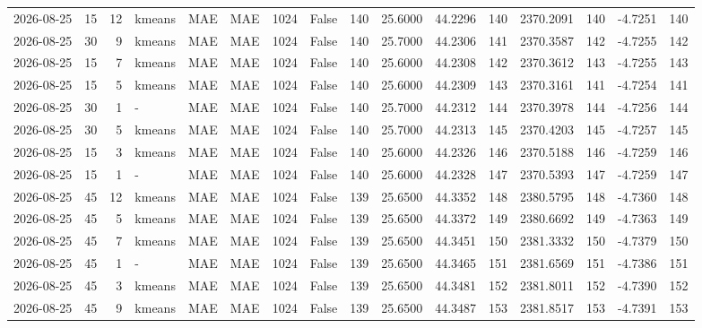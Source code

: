 \documentclass[10pt]{article}
\begin{document}
\begin{landscape}
\begin{longtable}{@{}lrrlllrcrrrrrrrr@{}}
2026-08-25 & 15 & 12 & kmeans & MAE & MAE & 1024 & False & 140 & 25.6000 & 44.2296 & 140 & 2370.2091 & 140 & -4.7251 & 140 \\
2026-08-25 & 30 & 9 & kmeans & MAE & MAE & 1024 & False & 140 & 25.7000 & 44.2306 & 141 & 2370.3587 & 142 & -4.7255 & 142 \\
2026-08-25 & 15 & 7 & kmeans & MAE & MAE & 1024 & False & 140 & 25.6000 & 44.2308 & 142 & 2370.3612 & 143 & -4.7255 & 143 \\
2026-08-25 & 15 & 5 & kmeans & MAE & MAE & 1024 & False & 140 & 25.6000 & 44.2309 & 143 & 2370.3161 & 141 & -4.7254 & 141 \\
2026-08-25 & 30 & 1 & - & MAE & MAE & 1024 & False & 140 & 25.7000 & 44.2312 & 144 & 2370.3978 & 144 & -4.7256 & 144 \\
2026-08-25 & 30 & 5 & kmeans & MAE & MAE & 1024 & False & 140 & 25.7000 & 44.2313 & 145 & 2370.4203 & 145 & -4.7257 & 145 \\
2026-08-25 & 15 & 3 & kmeans & MAE & MAE & 1024 & False & 140 & 25.6000 & 44.2326 & 146 & 2370.5188 & 146 & -4.7259 & 146 \\
2026-08-25 & 15 & 1 & - & MAE & MAE & 1024 & False & 140 & 25.6000 & 44.2328 & 147 & 2370.5393 & 147 & -4.7259 & 147 \\
2026-08-25 & 45 & 12 & kmeans & MAE & MAE & 1024 & False & 139 & 25.6500 & 44.3352 & 148 & 2380.5795 & 148 & -4.7360 & 148 \\
2026-08-25 & 45 & 5 & kmeans & MAE & MAE & 1024 & False & 139 & 25.6500 & 44.3372 & 149 & 2380.6692 & 149 & -4.7363 & 149 \\
2026-08-25 & 45 & 7 & kmeans & MAE & MAE & 1024 & False & 139 & 25.6500 & 44.3451 & 150 & 2381.3332 & 150 & -4.7379 & 150 \\
2026-08-25 & 45 & 1 & - & MAE & MAE & 1024 & False & 139 & 25.6500 & 44.3465 & 151 & 2381.6569 & 151 & -4.7386 & 151 \\
2026-08-25 & 45 & 3 & kmeans & MAE & MAE & 1024 & False & 139 & 25.6500 & 44.3481 & 152 & 2381.8011 & 152 & -4.7390 & 152 \\
2026-08-25 & 45 & 9 & kmeans & MAE & MAE & 1024 & False & 139 & 25.6500 & 44.3487 & 153 & 2381.8517 & 153 & -4.7391 & 153 \\
\bottomrule
\end{longtable}
\clearpage

\end{landscape}
\end{document}
